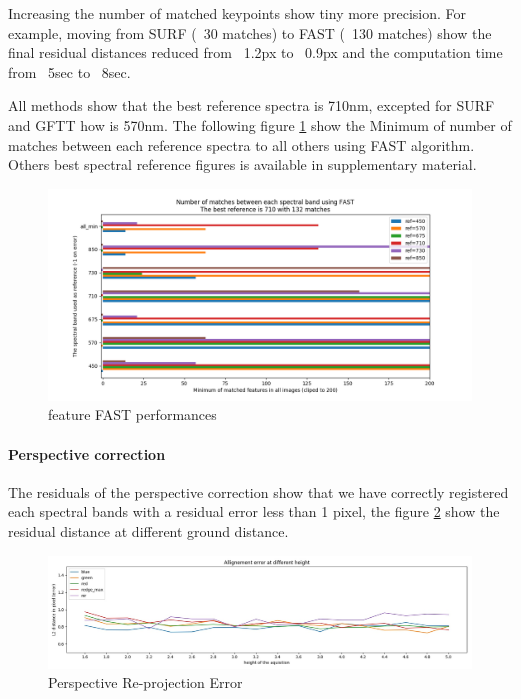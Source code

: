 \documentclass[]{elsarticle}
\begin{document}
			Increasing the number of matched keypoints show tiny more precision. For example, moving from SURF (~30 matches) to FAST (~130 matches)
			show the final residual distances reduced from ~1.2px to ~0.9px and the computation time from ~5sec to ~8sec.
			
			All methods show that the best reference spectra is 710nm, excepted for SURF and GFTT how is 570nm.
			The following figure \ref{fig:features-FAST-performances} show the Minimum of number of matches between each reference spectra to all others using FAST algorithm.
			Others best spectral reference figures is available in supplementary material.
			
			\begin{figure}[!htb]
				\centering
				\includegraphics[width=\linewidth]{../figures/comparaison-keypoint-matching-reference-FAST.png}
				\caption{feature FAST performances}
				\label{fig:features-FAST-performances}
			\end{figure}
		
			\paragraph{Perspective correction}
			The residuals of the perspective correction
			show that we have correctly registered each spectral bands with a residual error less than 1 pixel,
			the figure \ref{fig:perspective-error} show the residual distance at different ground distance.
			
			\begin{figure}[!htb]
				\centering
				\includegraphics[width=\linewidth]{../figures/prespective-allignement-rmse.jpg}
				\caption{Perspective Re-projection Error}
				\label{fig:perspective-error}
			\end{figure}
			
\end{document}
